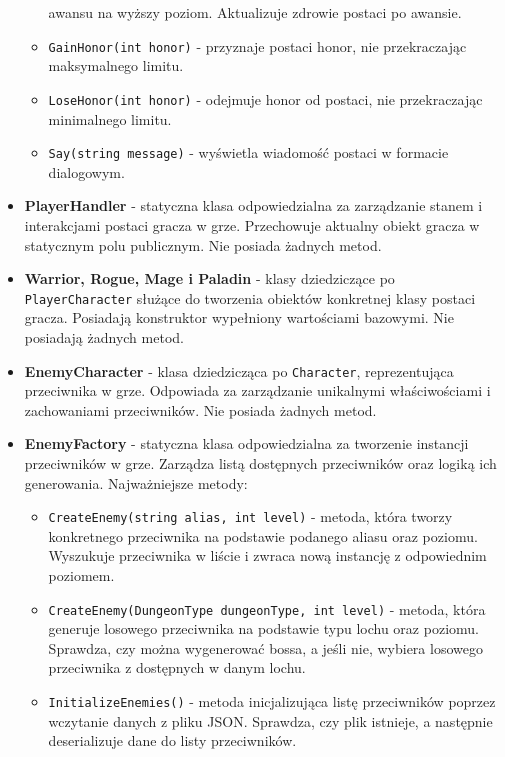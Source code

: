 \begin{itemize}
\begin{itemize}
                awansu na wyższy poziom. Aktualizuje zdrowie postaci po awansie.
                \item \texttt{GainHonor(int honor)} - przyznaje postaci honor, nie przekraczając maksymalnego limitu.
                \item \texttt{LoseHonor(int honor)} - odejmuje honor od postaci, nie przekraczając minimalnego limitu.
                \item \texttt{Say(string message)} - wyświetla wiadomość postaci w formacie dialogowym.
            \end{itemize}
        \item \textbf{PlayerHandler} - statyczna klasa odpowiedzialna za zarządzanie stanem i interakcjami postaci gracza w grze. 
        Przechowuje aktualny obiekt gracza w statycznym polu publicznym. Nie posiada żadnych metod.
        \item \textbf{Warrior, Rogue, Mage i Paladin} - klasy dziedziczące po \texttt{PlayerCharacter} służące do tworzenia obiektów konkretnej klasy postaci gracza. 
        Posiadają konstruktor wypełniony wartościami bazowymi. Nie posiadają żadnych metod.
        \item \textbf{EnemyCharacter} - klasa dziedzicząca po \texttt{Character}, reprezentująca przeciwnika w grze. 
        Odpowiada za zarządzanie unikalnymi właściwościami i zachowaniami przeciwników. Nie posiada żadnych metod.
        \item \textbf{EnemyFactory} - statyczna klasa odpowiedzialna za tworzenie instancji przeciwników w grze. 
        Zarządza listą dostępnych przeciwników oraz logiką ich generowania. Najważniejsze metody:
            \begin{itemize}
                \item \texttt{CreateEnemy(string alias, int level)} - metoda, która tworzy konkretnego przeciwnika na podstawie podanego aliasu 
                oraz poziomu. Wyszukuje przeciwnika w liście i zwraca nową instancję z odpowiednim poziomem.
                \item \texttt{CreateEnemy(DungeonType dungeonType, int level)} - metoda, która generuje losowego przeciwnika na podstawie typu lochu 
                oraz poziomu. Sprawdza, czy można wygenerować bossa, a jeśli nie, wybiera losowego przeciwnika z dostępnych w danym lochu.
                \item \texttt{InitializeEnemies()} - metoda inicjalizująca listę przeciwników poprzez wczytanie danych z pliku JSON. 
                Sprawdza, czy plik istnieje, a następnie deserializuje dane do listy przeciwników.

\end{itemize}
\end{itemize}
